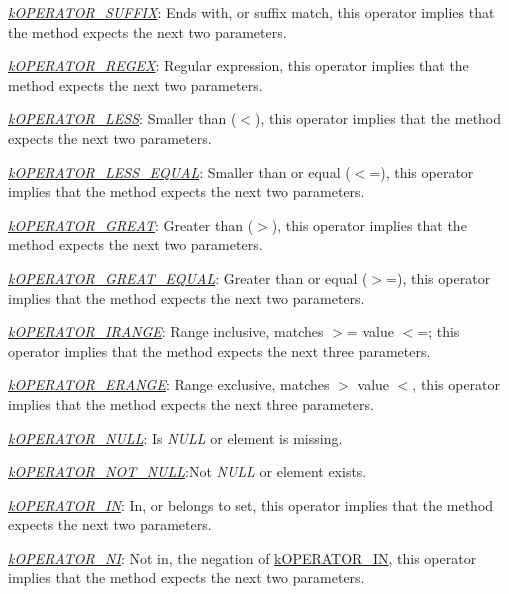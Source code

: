 \begin{DoxyItemize}
\begin{DoxyItemize}
\item {\itshape \hyperlink{}{k\-O\-P\-E\-R\-A\-T\-O\-R\-\_\-\-S\-U\-F\-F\-I\-X}}\-: Ends with, or suffix match, this operator implies that the method expects the next two parameters. 
\item {\itshape \hyperlink{}{k\-O\-P\-E\-R\-A\-T\-O\-R\-\_\-\-R\-E\-G\-E\-X}}\-: Regular expression, this operator implies that the method expects the next two parameters. 
\item {\itshape \hyperlink{}{k\-O\-P\-E\-R\-A\-T\-O\-R\-\_\-\-L\-E\-S\-S}}\-: Smaller than ($<$), this operator implies that the method expects the next two parameters. 
\item {\itshape \hyperlink{}{k\-O\-P\-E\-R\-A\-T\-O\-R\-\_\-\-L\-E\-S\-S\-\_\-\-E\-Q\-U\-A\-L}}\-: Smaller than or equal ($<$=), this operator implies that the method expects the next two parameters. 
\item {\itshape \hyperlink{}{k\-O\-P\-E\-R\-A\-T\-O\-R\-\_\-\-G\-R\-E\-A\-T}}\-: Greater than ($>$), this operator implies that the method expects the next two parameters. 
\item {\itshape \hyperlink{}{k\-O\-P\-E\-R\-A\-T\-O\-R\-\_\-\-G\-R\-E\-A\-T\-\_\-\-E\-Q\-U\-A\-L}}\-: Greater than or equal ($>$=), this operator implies that the method expects the next two parameters. 
\item {\itshape \hyperlink{}{k\-O\-P\-E\-R\-A\-T\-O\-R\-\_\-\-I\-R\-A\-N\-G\-E}}\-: Range inclusive, matches $>$= value $<$=; this operator implies that the method expects the next three parameters. 
\item {\itshape \hyperlink{}{k\-O\-P\-E\-R\-A\-T\-O\-R\-\_\-\-E\-R\-A\-N\-G\-E}}\-: Range exclusive, matches $>$ value $<$, this operator implies that the method expects the next three parameters. 
\item {\itshape \hyperlink{}{k\-O\-P\-E\-R\-A\-T\-O\-R\-\_\-\-N\-U\-L\-L}}\-: Is {\itshape N\-U\-L\-L} or element is missing. 
\item {\itshape \hyperlink{}{k\-O\-P\-E\-R\-A\-T\-O\-R\-\_\-\-N\-O\-T\-\_\-\-N\-U\-L\-L}}\-:Not {\itshape N\-U\-L\-L} or element exists. 
\item {\itshape \hyperlink{}{k\-O\-P\-E\-R\-A\-T\-O\-R\-\_\-\-I\-N}}\-: In, or belongs to set, this operator implies that the method expects the next two parameters. 
\item {\itshape \hyperlink{}{k\-O\-P\-E\-R\-A\-T\-O\-R\-\_\-\-N\-I}}\-: Not in, the negation of \hyperlink{}{k\-O\-P\-E\-R\-A\-T\-O\-R\-\_\-\-I\-N}, this operator implies that the method expects the next two parameters. 

\end{DoxyItemize}
\end{DoxyItemize}
